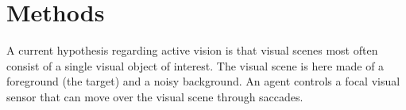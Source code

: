 \section{Methods}

A current hypothesis regarding active vision is that visual scenes most often consist of a single visual object of interest.
The visual scene is here made of a foreground (the target) and a noisy background. An agent controls a focal visual sensor that can move over the visual scene through saccades.

% 




